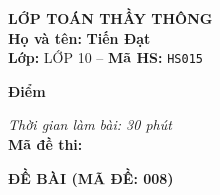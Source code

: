\noindent
\begin{tcolorbox}[colback=white,colframe=black,arc=0mm,boxrule=0.8pt,top=4pt,bottom=4pt,left=6pt,right=6pt]
	\begin{minipage}[c]{0.44\textwidth}
		{\bfseries\large LỚP TOÁN THẦY THÔNG}\\[3pt]
		\textbf{Họ và tên:} \textbf{\large Tiến Đạt}\\[3pt]
		\textbf{Lớp:} LỚP 10 \quad -- \quad \textbf{Mã HS:} \texttt{HS015}
	\end{minipage}
	\hfill
	\begin{minipage}[c]{0.22\textwidth}
		\begin{tcolorbox}[colback=white,colframe=black,arc=0mm,boxrule=0.6pt,height=1.8cm,halign=center,valign=top,top=2pt]
			{\bfseries\normalsize Điểm}
		\end{tcolorbox}
	\end{minipage}
	\hfill
	\begin{minipage}[c]{0.30\textwidth}
		\raggedleft
		\textit{Thời gian làm bài: 30 phút}\\[4pt]
		\textbf{Mã đề thi:} 
	\end{minipage}
\end{tcolorbox}
\vspace{0.25cm}

\noindent\textbf{\large ĐỀ BÀI (MÃ ĐỀ: 008)}
\vspace{0.1cm}

